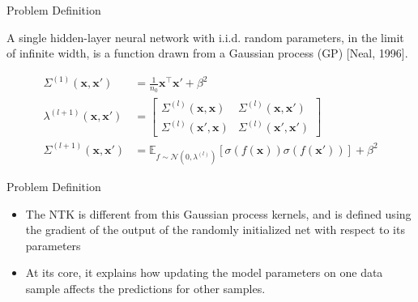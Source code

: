 \documentclass[serif, aspectratio=169]{beamer}
\begin{document}
\begin{frame}{Problem Definition}
		
	
		  A single hidden-layer neural network with i.i.d. random parameters, in the limit
		of infinite width, is a function drawn from a Gaussian process (GP) [Neal, 1996].
	
		\[
		\begin{aligned}
		\Sigma^{(1)}(\mathbf{x}, \mathbf{x}') &= \frac{1}{n_0}\mathbf{x}^\top{\mathbf{x}'} + \beta^2 \\
		\lambda^{(l+1)}(\mathbf{x}, \mathbf{x}') &= \begin{bmatrix}
			\Sigma^{(l)}(\mathbf{x}, \mathbf{x}) & \Sigma^{(l)}(\mathbf{x}, \mathbf{x}') \\
			\Sigma^{(l)}(\mathbf{x}', \mathbf{x}) & \Sigma^{(l)}(\mathbf{x}', \mathbf{x}')
		\end{bmatrix} \\
		\Sigma^{(l+1)}(\mathbf{x}, \mathbf{x}') &= \mathbb{E}_{f \sim \mathcal{N}(0, \lambda^{(l)})}[\sigma(f(\mathbf{x})) \sigma(f(\mathbf{x}'))] + \beta^2
	\end{aligned}
		\]
	

\end{frame}



\begin{frame}{Problem Definition}
	
	\begin{itemize}
		
		
		
		\item The NTK is different from this Gaussian process kernels, and is defined using the gradient of the output of the randomly initialized net
		with respect to its parameters
		
		
		\item  At its core, it explains how updating the model parameters on one data sample affects the predictions for other samples.
	\end{itemize}
\end{frame}
\end{document}
